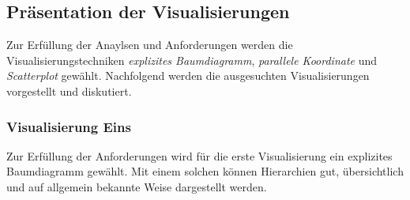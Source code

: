 \documentclass[usegeometry=true]{scrartcl}
\begin{document}
\subsection{Präsentation der Visualisierungen}
Zur Erfüllung der Anaylsen und Anforderungen werden die Visualisierungstechniken \textit{explizites Baumdiagramm}, \textit{parallele Koordinate} und \textit{Scatterplot} gewählt.
Nachfolgend werden die ausgesuchten Visualisierungen vorgestellt und diskutiert. 

\subsubsection{Visualisierung Eins}
Zur Erfüllung der Anforderungen wird für die erste Visualisierung ein explizites Baumdiagramm gewählt.
Mit einem solchen können Hierarchien gut, übersichtlich und auf allgemein bekannte Weise dargestellt werden. 

\end{document}
